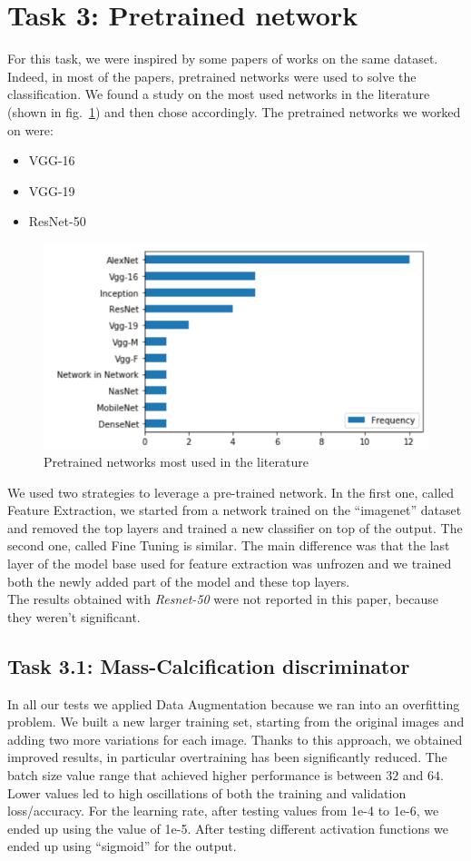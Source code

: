 \documentclass[11pt,a4paper,oneside]{article}
\begin{document}
\clearpage

\section{Task 3: Pretrained network}
For this task, we were inspired by some papers of works on the same dataset. Indeed, in most of the papers, pretrained networks were used to solve the classification. 
We found a study on the most used networks in the literature (shown in fig.~\ref{fig:pretrained_networks}) and then chose accordingly. The pretrained networks we worked on were:
\begin{itemize}
\item VGG-16
\item VGG-19
\item ResNet-50
\end{itemize}

\begin{figure}[h]
\centering
\includegraphics[width=.5\textwidth]{images/pretrained_networks}
\caption{Pretrained networks most used in the literature}
\label{fig:pretrained_networks}
\end{figure}

We used two strategies to leverage a pre-trained network. In the first one, called Feature Extraction, we started from a network trained on the “imagenet” dataset and removed the top layers and trained a new classifier on top of the output.
The second one, called Fine Tuning is similar. The main difference was that the last layer of the model base used for feature extraction was unfrozen and we trained both the newly added part of the model and these top layers. \\
The results obtained with \textit{Resnet-50} were not reported in this paper, because they weren't significant.

\subsection{Task 3.1: Mass-Calcification discriminator}
In all our tests we applied Data Augmentation because we ran into an overfitting problem.
We built a new larger training set, starting from the original images and adding two more variations for each image. Thanks to this approach, we obtained improved results, in particular overtraining has been significantly reduced. The batch size value range that achieved higher performance is between $32$ and $64$. Lower values led to high oscillations of both the training and validation loss/accuracy. For the learning rate, after testing values from 1e-4 to 1e-6, we ended up using the value of 1e-5. After testing different activation functions we ended up using “sigmoid” for the output. 
\end{document}
